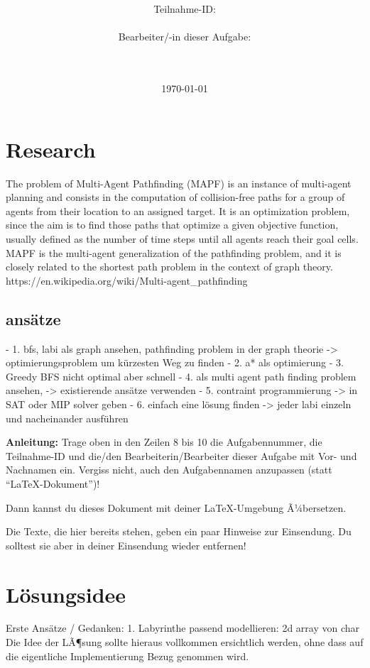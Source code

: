 \documentclass[a4paper,10pt,ngerman]{scrartcl}
\title{\textbf{\Huge\Aufgabe}}
\author{\LARGE Teilnahme-ID: \LARGE \TeilnahmeId \\\\
	    \LARGE Bearbeiter/-in dieser Aufgabe: \\ 
	    \LARGE \Name\\\\}
\date{\LARGE\today}
\begin{document}
\maketitle
\tableofcontents

\vspace{0.5cm}

\section{Research}
The problem of Multi-Agent Pathfinding (MAPF) is an instance of multi-agent planning and consists in the computation of collision-free paths for a group of agents from their location to an assigned target. It is an optimization problem, since the aim is to find those paths that optimize a given objective function, usually defined as the number of time steps until all agents reach their goal cells. MAPF is the multi-agent generalization of the pathfinding problem, and it is closely related to the shortest path problem in the context of graph theory. 
\newline
https://en.wikipedia.org/wiki/Multi-agent_pathfinding
\newline
\subsection{ansätze}
- 1. bfs, labi als graph ansehen, pathfinding problem in der graph theorie -> optimierungsproblem um kürzesten Weg zu finden
- 2. a* als optimierung
- 3. Greedy BFS nicht optimal aber schnell
- 4. als multi agent path finding problem ansehen, -> existierende ansätze verwenden
- 5. contraint programmierung -> in SAT oder MIP solver geben
- 6. einfach eine lösung finden -> jeder labi einzeln und nacheinander ausführen

\textbf{Anleitung:} Trage oben in den Zeilen 8 bis 10 die Aufgabennummer, die Teilnahme-ID und die/den Bearbeiterin/Bearbeiter dieser Aufgabe mit Vor- und Nachnamen ein.
Vergiss nicht, auch den Aufgabennamen anzupassen (statt "`\LaTeX-Dokument"')!

Dann kannst du dieses Dokument mit deiner \LaTeX-Umgebung Ã¼bersetzen.

Die Texte, die hier bereits stehen, geben ein paar Hinweise zur
Einsendung. Du solltest sie aber in deiner Einsendung wieder entfernen!

\section{Lösungsidee}
Erste Ansätze / Gedanken: 1. Labyrinthe passend modellieren: 2d array von char
Die Idee der LÃ¶sung sollte hieraus vollkommen ersichtlich werden, ohne dass auf die eigentliche Implementierung Bezug genommen wird.
\end{document}
